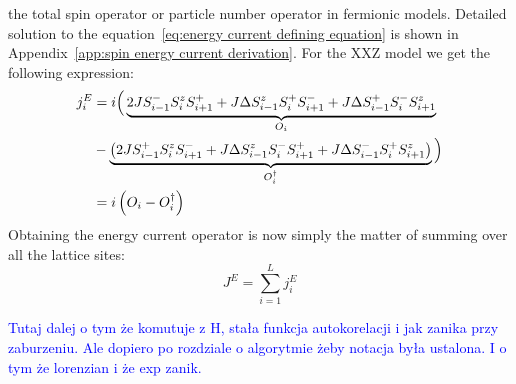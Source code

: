 the total spin operator or particle number operator in fermionic models. Detailed solution to the equation~\eqref{eq:energy current defining equation}
is shown in Appendix~\ref{app:spin energy current derivation}. For the XXZ model we get the following expression:
\begin{align*}
  j_i^E & = i \Big( \underbrace{2J S^{-}_{i-1}S^{z}_i S^{+}_{i+1} + J \Delta S^{z}_{i-1}S^{+}_i S^{-}_{i+1} + J\Delta S^{+}_{i-1}S^{-}_iS^{z}_{i+1}}_{O_i}                                  \\
        & - \underbrace{\left(2J S^{+}_{i-1}S^{z}_i S^{-}_{i+1} + J\Delta S^{z}_{i-1}S^{-}_i S^{+}_{i+1} + J\Delta S^{-}_{i-1}S^{+}_{i} S^{z}_{i+1} \right)}_{O_i^{\dagger}}\Big) \nonumber \\
        & = i\left(O_i - O_i^{\dagger}\right)
\end{align*}
Obtaining the energy current operator is now simply the matter of summing over all the lattice sites:
\begin{equation}
  J^E = \sum_{i=1}^L j_i^E
  \label{eq:energy current}
\end{equation}

\textcolor{blue}{Tutaj dalej o tym że komutuje z H, stała funkcja autokorelacji i 
jak zanika przy zaburzeniu. Ale dopiero po rozdziale o algorytmie żeby notacja była ustalona.
I o tym że lorenzian i że exp zanik.}
